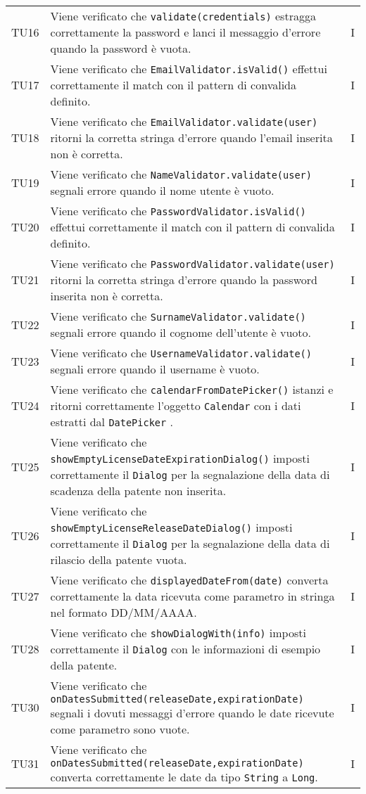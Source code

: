 \begin{longtable}{ >{\centering}p{}  >{\centering}p{} >{\centering}p{}
			}
		\tabularnewline	
		TU16 & Viene verificato che \texttt{validate(credentials)} estragga correttamente la password e lanci il messaggio d'errore quando la password è vuota. & I 
		\tabularnewline	
		TU17 & Viene verificato che \texttt{EmailValidator.isValid()} effettui correttamente il match con il pattern di convalida definito. & I 
		\tabularnewline	
		TU18 & Viene verificato che \texttt{EmailValidator.validate(user)} ritorni la corretta stringa d'errore quando l'email inserita non è corretta. & I 
		\tabularnewline	
		TU19 & Viene verificato che \texttt{NameValidator.validate(user)} segnali errore quando il nome utente è vuoto. & I 
		\tabularnewline	
		TU20 & Viene verificato che \texttt{PasswordValidator.isValid()} effettui correttamente il match con il pattern di convalida definito. & I 
		\tabularnewline	
		TU21 & Viene verificato che \texttt{PasswordValidator.validate(user)} ritorni la corretta stringa d'errore quando la password inserita non è corretta. & I 
		\tabularnewline	
		TU22 & Viene verificato che \texttt{SurnameValidator.validate()} segnali errore quando il cognome dell'utente è vuoto. & I 
		\tabularnewline	
		TU23 & Viene verificato che \texttt{UsernameValidator.validate()} segnali errore quando il username è vuoto. & I 
		\tabularnewline	
		TU24 & Viene verificato che \texttt{calendarFromDatePicker()} istanzi e ritorni correttamente l'oggetto \texttt{Calendar} con i dati estratti dal \texttt{DatePicker} . & I 
		\tabularnewline	
		TU25 & Viene verificato che \texttt{showEmptyLicenseDateExpirationDialog()} imposti correttamente il \texttt{Dialog} per la segnalazione della data di scadenza della patente non inserita. & I 
		\tabularnewline	
		TU26 & Viene verificato che \texttt{showEmptyLicenseReleaseDateDialog()} imposti correttamente il \texttt{Dialog} per la segnalazione della data di rilascio della patente vuota. & I 
		\tabularnewline	
		TU27 & Viene verificato che \texttt{displayedDateFrom(date)} converta correttamente la data ricevuta come parametro in stringa nel formato DD/MM/AAAA. & I 
		\tabularnewline	
		TU28 & Viene verificato che \texttt{showDialogWith(info)} imposti correttamente il \texttt{Dialog} con le informazioni di esempio della patente. & I
		\tabularnewline	
		TU30 & Viene verificato che \texttt{onDatesSubmitted(releaseDate,expirationDate)} segnali i dovuti messaggi d'errore quando le date ricevute come parametro sono vuote. & I
		\tabularnewline	
		TU31 & Viene verificato che \texttt{onDatesSubmitted(releaseDate,expirationDate)} converta correttamente le date da tipo \texttt{String} a \texttt{Long}. & I 
		\tabularnewline	

\end{longtable}

